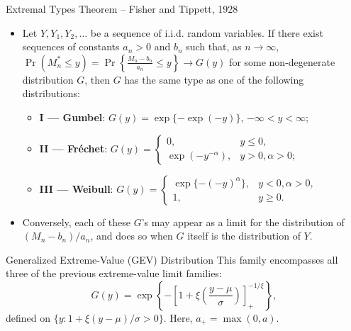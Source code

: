 \documentclass[10pt, hyperref={colorlinks = true,linkcolor = blue}]{beamer}
\begin{document}
{{\begin{frame}{Extremal Types Theorem --  Fisher and Tippett, 1928}
\begin{itemize}
    \item Let $Y, Y_1, Y_2, \ldots$ be a sequence of i.i.d. random variables. If there exist sequences of constants $a_n > 0$ and $b_n$ such that, as $n \to \infty$,
    \(
    \Pr(M^*_n \leq y) = \Pr\left\{\frac{M_n - b_n}{a_n} \leq y\right\} \to G(y)
    \)
    for some non-degenerate distribution $G$, then $G$ has the same type as one of the following distributions:
    \begin{itemize}
        \item \textbf{I — Gumbel}: $G(y) = \exp\{-\exp(-y)\}$, $-\infty < y < \infty$;
        \item \textbf{II — Fréchet}:
        \(
        G(y) =
        \begin{cases}
        0, & y \leq 0, \\
        \exp(-y^{-\alpha}), & y > 0, \alpha > 0;
        \end{cases}
        \)
        \item \textbf{III — Weibull}:
        \(
        G(y) =
        \begin{cases}
        \exp\{-( -y)^\alpha\}, & y < 0, \alpha > 0, \\
        1, & y \geq 0.
        \end{cases}
        \)
    \end{itemize}
    \item Conversely, each of these $G$'s may appear as a limit for the distribution of $(M_n - b_n)/a_n$, and does so when $G$ itself is the distribution of $Y$.
\end{itemize}

\end{frame}

\begin{frame}{Generalized Extreme-Value (GEV) Distribution}
This family encompasses all three of the previous extreme-value limit families:
\[
G(y) = \exp \left\{
-\left[1 + \xi \left(\frac{y - \mu}{\sigma}\right)\right]^{-1/\xi}_+
\right\},
\]
defined on $\{y : 1 + \xi(y - \mu)/\sigma > 0\}$. Here, $a_+ = \max(0, a)$.


\end{frame}}}
\end{document}
